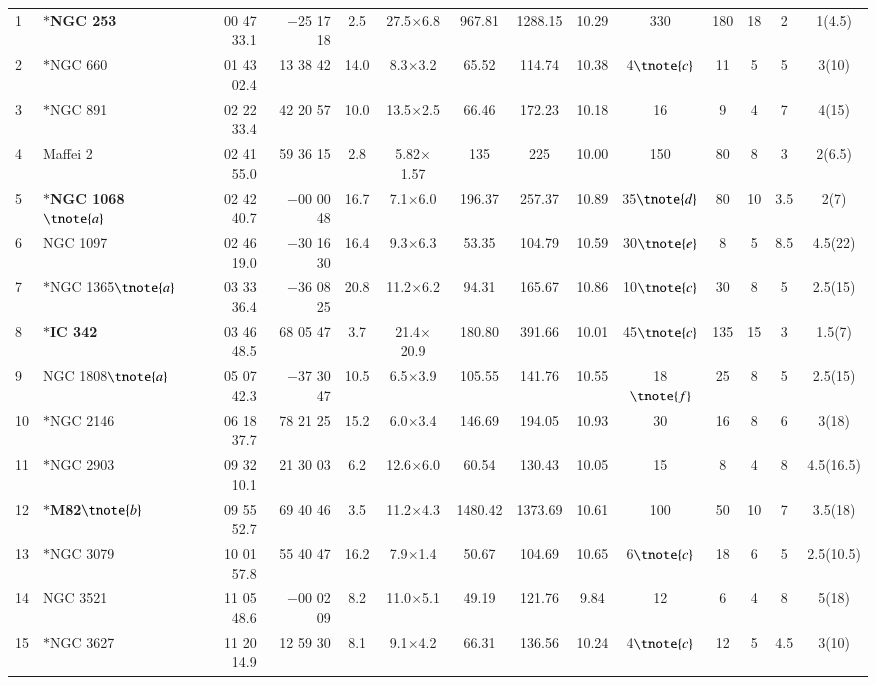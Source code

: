 \documentclass[legal,11pt]{article}
\begin{document}
\begin{table}
\begin{threeparttable}[b]
\begin{tabular}{llrrcccccccccc}
1 & $\ast${\bf NGC 253} & 00 47 33.1 & $-$25 17 18 & 2.5 & 27.5$\times$6.8  & 967.81 & 1288.15 & 10.29 & 330 & 180 & 18 & 2 & 1(4.5) \\
2 & $\ast$NGC 660 & 01 43 02.4 & 13 38 42 & 14.0 & 8.3$\times$3.2 & 65.52 & 114.74 & 10.38 & 4$\tnote{c}$ & 11 & 5 & 5 & 3(10) \\
3 & $\ast$NGC 891 & 02 22 33.4 & 42 20 57 & 10.0 & 13.5$\times$2.5  & 66.46 & 172.23 & 10.18 & 16 & 9 & 4 & 7 & 4(15) \\
4 & Maffei 2 & 02 41 55.0 & 59 36 15 & 2.8 & 5.82$\times$1.57  & 135 & 225 & 10.00 & 150 & 80 & 8 & 3 & 2(6.5) \\ 
5 & $\ast${\bf NGC 1068}$\tnote{a}$ & 02 42 40.7 & $-$00 00 48 & 16.7 & 7.1$\times$6.0  & 196.37 & 257.37 & 10.89 & 35$\tnote{d}$ & 80 & 10 & 3.5 & 2(7) \\
6 & NGC 1097 & 02 46 19.0 & $-$30 16 30 & 16.4 & 9.3$\times$6.3  & 53.35 & 104.79 & 10.59 & 30$\tnote{e}$ & 8 & 5 & 8.5 & 4.5(22) \\
7 & $\ast$NGC 1365$\tnote{a}$ & 03 33 36.4 & $-$36 08 25 & 20.8 & 11.2$\times$6.2  & 94.31 & 165.67 & 10.86 & 10$\tnote{c}$ & 30 & 8 & 5 & 2.5(15) \\
8 & $\ast${\bf IC 342} & 03 46 48.5 & 68 05 47 & 3.7 & 21.4$\times$20.9  & 180.80 & 391.66 & 10.01 & 45$\tnote{c}$ & 135 & 15 & 3 & 1.5(7) \\
9 & NGC 1808$\tnote{a}$ & 05 07 42.3 & $-$37 30 47 & 10.5 & 6.5$\times$3.9  & 105.55 & 141.76 & 10.55 & 18$\tnote{f}$ & 25 & 8 & 5 & 2.5(15) \\
10 & $\ast$NGC 2146 & 06 18 37.7 & 78 21 25 & 15.2 & 6.0$\times$3.4  & 146.69 & 194.05 & 10.93 & 30 & 16 & 8 & 6 & 3(18) \\
11 & $\ast$NGC 2903 & 09 32 10.1 & 21 30 03 & 6.2 & 12.6$\times$6.0  & 60.54 & 130.43 & 10.05 & 15 & 8 & 4 & 8 & 4.5(16.5) \\
12 & $\ast${\bf M82}$\tnote{b}$ & 09 55 52.7 & 69 40 46 & 3.5 & 11.2$\times$4.3  & 1480.42 & 1373.69 & 10.61 & 100 & 50 & 10 & 7 & 3.5(18) \\
13 & $\ast$NGC 3079 & 10 01 57.8 & 55 40 47 & 16.2 & 7.9$\times$1.4  & 50.67 & 104.69 & 10.65 & 6$\tnote{c}$ & 18 & 6 & 5 & 2.5(10.5) \\
14 & NGC 3521 & 11 05 48.6 & $-$00 02 09 & 8.2 & 11.0$\times$5.1  & 49.19 & 121.76 & 9.84 & 12 & 6 & 4 & 8 & 5(18) \\
15 & $\ast$NGC 3627 & 11 20 14.9 & 12 59 30 & 8.1 & 9.1$\times$4.2  & 66.31 & 136.56 & 10.24 & 4$\tnote{c}$ & 12 & 5 & 4.5 & 3(10)  \\

\end{tabular}
\end{threeparttable}
\end{table}
\end{document}
